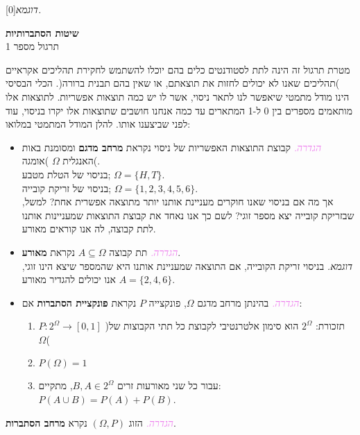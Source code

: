 \documentclass[12pt,a4paper]{article}
\begin{document}
 
\newcommand{\coursename}{שיטות הסתברותיות}
\newcommand{\recnumber}[1]{תרגול מספר #1}
\newcommand{\tutorer}{נתן ולהיימר}

\newenvironment{Solution}{\\ \textcolor{ForestGreen}{\textit{פיתרון:}} \\ \small}

\newcommand{\Example}[0]{\textcolor{OliveGreen}{\textit{דוגמא. }}}


\pagestyle{fancy}
\fancyhead{}
\renewcommand{\headrulewidth}{0cm}
\fancyfoot{}
\fancyfoot[RE,RO]{\thepage}

\begingroup 
\color{BrickRed}
\centering
  \huge \textbf{\coursename}\\[0.1cm]
  \Large \recnumber{1} \\[0.1cm]
\endgroup
\begin{flushleft}
מטרת תרגול זה הינה לתת לסטודנטים כלים בהם יוכלו להשתמש לחקירת תהליכים אקראיים )תהליכים שאנו לא יכולים לחזות את תוצאתם, או שאין בהם תבנית ברורה(. הכלי הבסיסי הינו מודל מתמטי שיאפשר לנו לתאר ניסוי, אשר לו יש כמה תוצאות אפשריות. לתוצאות אלו מותאמים מספרים בין 0 ל-1 המתארים עד כמה אנחנו חושבים שתוצאות אלו יקרו בניסוי, עוד לפני שביצענו אותו. להלן המודל המתמטי במלואו:
\begin{itemize}
\item \textcolor{Violet}{\textit{הגדרה.}} קבוצת התוצאות האפשריות של ניסוי נקראת \textbf{מרחב מדגם} ומסומנת באות האנגלית $\Omega$ )אומגה(. \\
\Example בניסוי של הטלת מטבע; $\Omega = \{H,T\}$.\\
\Example בניסוי של זריקת קובייה; $\Omega=\{1,2,3,4,5,6\}$. \\
אך מה אם בניסוי שאנו חוקרים מעניינת אותנו יותר מתוצאה אפשרית אחת? למשל, שבזריקת קובייה יצא מספר זוגי? לשם כך אנו נאחד את קבוצת התוצאות שמעניינות אותנו לתת קבוצה, לה אנו קוראים מאורע.
\item \textcolor{Violet}{\textit{הגדרה.}} תת קבוצה $A \subseteq \Omega$ נקראת \textbf{מאורע}. \\
\textcolor{OliveGreen}{\textit{דוגמא.}} בניסוי זריקת הקובייה, אם התוצאה שמעניינת אותנו היא שהמספר שיצא הינו זוגי, אנו יכולים להגדיר מאורע $A=\{2,4,6\}$.
\item \textcolor{Violet}{\textit{הגדרה.}} בהינתן מרחב מדגם $\Omega$, פונקצייה $P$ נקראת \textbf{פונקציית הסתברות} אם:
\begin{enumerate}
\item $P:2^{\Omega} \rightarrow [0,1]$ \quad )תזכורת: $2^\Omega$ הוא סימון אלטרנטיבי לקבוצת כל תתי הקבוצות של $\Omega$(
\item $P(\Omega)=1$
\item עבור כל שני מאורעות זרים $B,A \in 2^{\Omega}$, מתקיים: $P(A \cup B) = P(A) + P(B)$.
\end{enumerate}
\end{itemize}
\textcolor{Violet}{\textit{הגדרה.}} הזוג $(\Omega,P)$ נקרא \textbf{מרחב הסתברות}.
\end{flushleft}
\end{document}
